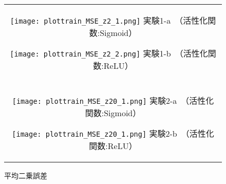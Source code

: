 \documentclass[12pt]{jsarticle}
\begin{document}
\begin{figure}[ht]
  \begin{center}
    \begin{tabular}{c}

      \begin{minipage}{0.5\hsize}
        \begin{center}
          \texttt{[image: plottrain\_MSE\_z2\_1.png]}
          \hspace{0.2cm} 実験1-a　（活性化関数:Sigmoid）
        \end{center}
      \end{minipage}

      \begin{minipage}{0.5\hsize}
        \begin{center}
          \texttt{[image: plottrain\_MSE\_z2\_2.png]}
        \hspace{0.2cm} 実験1-b　（活性化関数:ReLU）
        \end{center}
      \end{minipage}\\\\


      \begin{minipage}{0.5\hsize}
        \begin{center}
          \texttt{[image: plottrain\_MSE\_z20\_1.png]}
          \hspace{0.2cm} 実験2-a　（活性化関数:Sigmoid）
        \end{center}
      \end{minipage}

      \begin{minipage}{0.5\hsize}
        \begin{center}
          \texttt{[image: plottrain\_MSE\_z20\_1.png]}
          \hspace{0.2cm} 実験2-b　（活性化関数:ReLU）
        \end{center}
      \end{minipage}

    \end{tabular}
    \caption{平均二乗誤差}
     \label{fig:MSE2}
  \end{center}
\end{figure}
\end{document}
